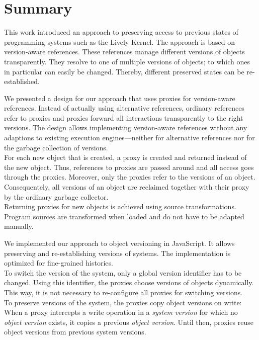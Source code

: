 \chapter{Summary} \label{chapter:SUMMARY}

This work introduced an approach to preserving access to previous states of programming systems such as the Lively Kernel.
The approach is based on version-aware references.
These references manage different versions of objects transparently.
They resolve to one of multiple versions of objects; to which ones in particular can easily be changed.
Thereby, different preserved states can be re-established.

We presented a design for our approach that uses proxies for version-aware references.
Instead of actually using alternative references, ordinary references refer to proxies and proxies forward all interactions transparently to the right versions.
The design allows implementing version-aware references without any adaptions to existing execution engines---neither for alternative references nor for the garbage collection of versions.\\
For each new object that is created, a proxy is created and returned instead of the new object.
Thus, references to proxies are passed around and all access goes through the proxies.
Moreover, only the proxies refer to the versions of an object.
Consequentely, all versions of an object are reclaimed together with their proxy by the ordinary garbage collector.\\
Returning proxies for new objects is achieved using source transformations.
Program sources are transformed when loaded and do not have to be adapted manually.

We implemented our approach to object versioning in JavaScript.
It allows preserving and re-establishing versions of systems.
The implementation is optimized for fine-grained histories.\\
To switch the version of the system, only a global version identifier has to be changed.
Using this identifier, the proxies choose versions of objects dynamically.
This way, it is not necessary to re-configure all proxies for switching versions.\\
To preserve versions of the system, the proxies copy object versions on write: When a proxy intercepts a write operation in a \emph{system version} for which no \emph{object version} exists, it copies a previous \emph{object version}.
Until then, proxies reuse object versions from previous system versions.

